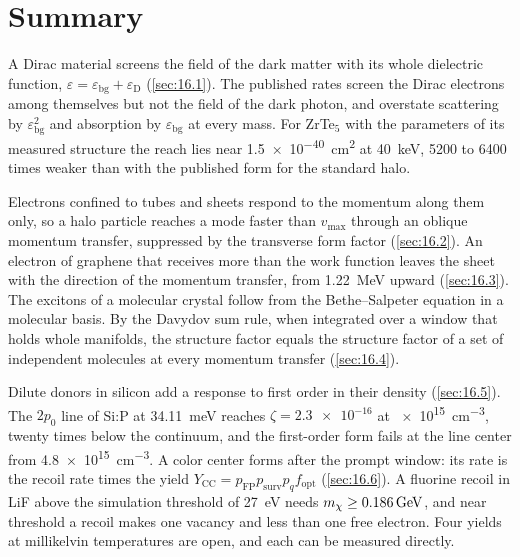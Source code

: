 \section*{Summary}

A Dirac material screens the field of the dark matter with its whole dielectric function, $\varepsilon = \varepsilon_{\mathrm{bg}} + \varepsilon_{\mathrm{D}}$ (\cref{sec:16.1}). The published rates screen the Dirac electrons among themselves but not the field of the dark photon, and overstate scattering by $\varepsilon_{\mathrm{bg}}^2$ and absorption by $\varepsilon_{\mathrm{bg}}$ at every mass. For ZrTe$_5$ with the parameters of its measured structure the reach lies near \SI{1.5e-40}{cm^2} at \SI{40}{keV}, 5200 to 6400 times weaker than with the published form for the standard halo.

Electrons confined to tubes and sheets respond to the momentum along them only, so a halo particle reaches a mode faster than $v_{\mathrm{max}}$ through an oblique momentum transfer, suppressed by the transverse form factor (\cref{sec:16.2}). An electron of graphene that receives more than the work function leaves the sheet with the direction of the momentum transfer, from \SI{1.22}{MeV} upward (\cref{sec:16.3}). The excitons of a molecular crystal follow from the Bethe--Salpeter equation in a molecular basis. By the Davydov sum rule, when integrated over a window that holds whole manifolds, the structure factor equals the structure factor of a set of independent molecules at every momentum transfer (\cref{sec:16.4}).

Dilute donors in silicon add a response to first order in their density (\cref{sec:16.5}). The $2p_0$ line of Si:P at \SI{34.11}{meV} reaches $\zeta = \num{2.3e-16}$ at \SI{e15}{cm^{-3}}, twenty times below the continuum, and the first-order form fails at the line center from \SI{4.8e15}{cm^{-3}}. A color center forms after the prompt window: its rate is the recoil rate times the yield $Y_{\mathrm{CC}} = p_{\mathrm{FP}}p_{\mathrm{surv}}p_qf_{\mathrm{opt}}$ (\cref{sec:16.6}). A fluorine recoil in LiF above the simulation threshold of \SI{27}{eV} needs $m_{\chi} \ge \SI{0.186}{GeV}$, and near threshold a recoil makes one vacancy and less than one free electron. Four yields at millikelvin temperatures are open, and each can be measured directly.

